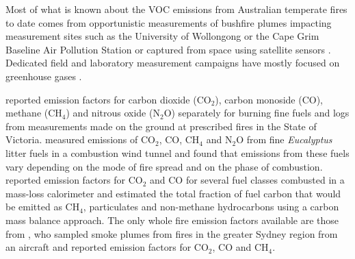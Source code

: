\documentclass[acp, manuscript]{copernicus}
\begin{document}
Most of what is known about the VOC emissions from Australian temperate fires to date comes from opportunistic measurements of bushfire plumes impacting measurement sites such as the University of Wollongong \citep{Paton-Walsh2005,Paton-Walsh2008, Rea2016} or the Cape Grim Baseline Air Pollution Station \citep{Lawson2015} or captured from space using satellite sensors \citep{Young2011,Glatthor2013}. Dedicated field and laboratory measurement campaigns have mostly focused on greenhouse gases \citep{Hurst1996,Volkova2014, Possell2015, Surawski2015}.

\citet{Volkova2014} reported emission factors for carbon dioxide (CO$_2$), carbon monoside (CO), methane (CH$_4$) and nitrous oxide (N$_2$O) separately for burning fine fuels and logs from measurements made on the ground at prescribed fires in the State of Victoria. \citet{Surawski2015} measured emissions of CO$_2$, CO, CH$_4$ and N$_2$O from fine \textit{Eucalyptus}
 litter fuels in a combustion wind tunnel and found that emissions from these fuels vary depending on the mode of fire spread and on the phase of combustion. \citet{Possell2015} reported emission factors for CO$_2$ and CO for several fuel classes combusted in a mass-loss calorimeter and estimated the total fraction of fuel carbon that would be emitted as CH$_4$, particulates and non-methane hydrocarbons using a carbon mass balance approach. The only whole fire emission factors available are those from \citet{Hurst1996}, who sampled smoke plumes from fires in the greater Sydney region from an aircraft and reported emission factors for CO$_2$, CO and CH$_4$. 
\end{document}
